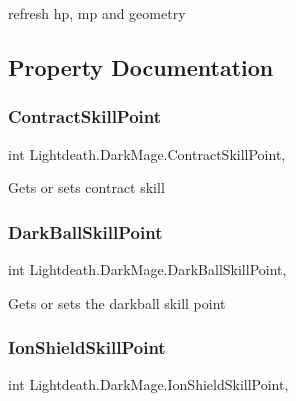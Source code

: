 refresh hp, mp and geometry 



\subsection{Property Documentation}
\hypertarget{class_lightdeath_1_1_dark_mage_a803827ae41700067722dd65fda17768f}{}\label{class_lightdeath_1_1_dark_mage_a803827ae41700067722dd65fda17768f} 
\subsubsection{\texorpdfstring{Contract\+Skill\+Point}{ContractSkillPoint}}
{\footnotesize\ttfamily int Lightdeath.\+Dark\+Mage.\+Contract\+Skill\+Point\hspace{0.3cm}{\ttfamily [get]}, {\ttfamily [set]}}



Gets or sets contract skill 

\hypertarget{class_lightdeath_1_1_dark_mage_aeb95de4356223b8f435bb42958cdc9dd}{}\label{class_lightdeath_1_1_dark_mage_aeb95de4356223b8f435bb42958cdc9dd} 
\subsubsection{\texorpdfstring{Dark\+Ball\+Skill\+Point}{DarkBallSkillPoint}}
{\footnotesize\ttfamily int Lightdeath.\+Dark\+Mage.\+Dark\+Ball\+Skill\+Point\hspace{0.3cm}{\ttfamily [get]}, {\ttfamily [set]}}



Gets or sets the darkball skill point 

\hypertarget{class_lightdeath_1_1_dark_mage_a64ba6d662fc9c6be2fcb65cca9c475e8}{}\label{class_lightdeath_1_1_dark_mage_a64ba6d662fc9c6be2fcb65cca9c475e8} 
\subsubsection{\texorpdfstring{Ion\+Shield\+Skill\+Point}{IonShieldSkillPoint}}
{\footnotesize\ttfamily int Lightdeath.\+Dark\+Mage.\+Ion\+Shield\+Skill\+Point\hspace{0.3cm}{\ttfamily [get]}, {\ttfamily [set]}}



